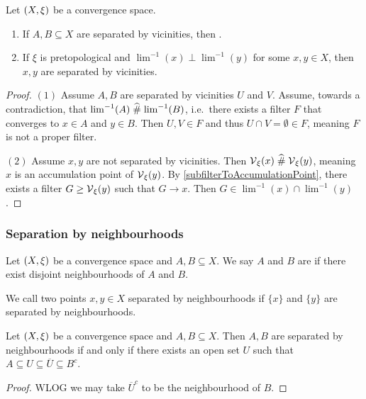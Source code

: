 \begin{proposition} \label{separationByVicinitiesEquivalences}
Let $\left( X,\xi \right)$ be a convergence space.
\begin{enumerate}
\item If $A,B \subseteq X$ are separated by vicinities, then .
\item If $\xi$ is pretopological and $\lim^{-1}(x)\perp \lim^{-1}(y)$ for some $x,y\in X$, then $x,y$ are separated by vicinities.
\end{enumerate}
\end{proposition}
\begin{proof}
$(1)$ Assume $A,B$ are separated by vicinities $U$ and $V$. Assume, towards a contradiction, that $\lim^{-1}(A)\mathrel{\widehat{\#}} \lim^{-1}(B)$, i.e.\ there exists a filter $F$ that converges to $x\in A$ and $y\in B$. Then $U,V\in F$ and thus $U\cap V = \emptyset \in F$, meaning $F$ is not a proper filter.

$(2)$ Assume $x,y$ are not separated by vicinities. Then $\operatorname{\mathcal{V}}_\xi(x)\mathrel{\widehat{\#}} \operatorname{\mathcal{V}}_\xi(y)$, meaning $x$ is an accumulation point of $\operatorname{\mathcal{V}}_\xi(y)$. By \ref{subfilterToAccumulationPoint}, there exists a filter $G\geq \operatorname{\mathcal{V}}_\xi(y)$ such that $G\to x$. Then $G\in \lim^{-1}(x)\cap \lim^{-1}(y)$.
\end{proof}

\subsubsection{Separation by neighbourhoods}
\begin{definition}
Let $\left( X,\xi \right)$ be a convergence space and $A,B\subseteq X$. We say $A$ and $B$ are  if there exist disjoint neighbourhoods of $A$ and $B$.

We call two points $x,y\in X$ separated by neighbourhoods if $\{x\}$ and $\{y\}$ are separated by neighbourhoods.
\end{definition}

\begin{lemma} \label{neighbourhoodSeparationLemma}
Let $\left( X,\xi \right)$ be a convergence space and $A,B\subseteq X$. Then $A,B$ are separated by neighbourhoods \textup{if and only if} there exists an open set $U$ such that $A \subseteq U \subseteq \overline{U} \subseteq B^c$.
\end{lemma}
\begin{proof}
WLOG we may take $\overline{U}^c$ to be the neighbourhood of $B$.
\end{proof}

